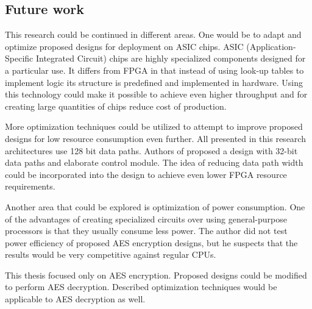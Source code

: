 \subsection{Future work}
\label{sec:future-work}
This research could be continued in different areas. One would be to adapt and optimize proposed designs for deployment on ASIC chips. ASIC (Application-Specific Integrated Circuit) chips are highly specialized components designed for a particular use. It differs from FPGA in that instead of using look-up tables to implement logic its structure is predefined and implemented in hardware. Using this technology could make it possible to achieve even higher throughput and for creating large quantities of chips reduce cost of production.

More optimization techniques could be utilized to attempt to improve proposed designs for low resource consumption even further. All presented in this research architectures use 128 bit data paths. Authors of \cite{good2005aes} proposed a design with 32-bit data paths and elaborate control module. The idea of reducing data path width could be incorporated into the design to achieve even lower FPGA resource requirements.

Another area that could be explored is optimization of power consumption. One of the advantages of creating specialized circuits over using general-purpose processors is that they usually consume less power. The author did not test power efficiency of proposed AES encryption designs, but he suspects that the results would be very competitive against regular CPUs.

This thesis focused only on AES encryption. Proposed designs could be modified to perform AES decryption. Described optimization techniques would be applicable to AES decryption as well.
